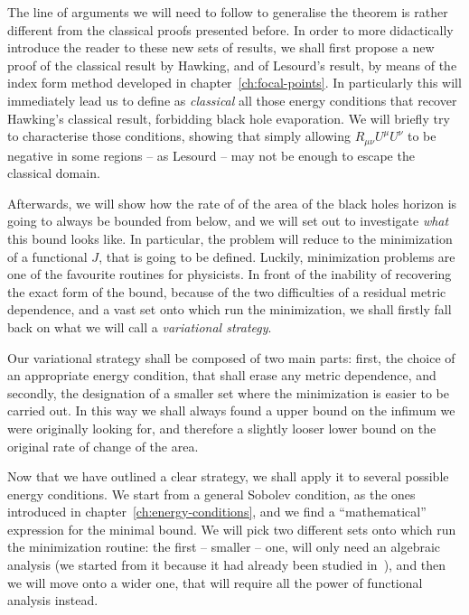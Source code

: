 The line of arguments we will need to follow to generalise the theorem is rather different from the classical proofs presented before. In order to more didactically introduce the reader to these new sets of results, we shall first propose a new proof of the classical result by Hawking, and of Lesourd's result, by means of the index form method developed in chapter~\ref{ch:focal-points}. In particularly this will immediately lead us to define as \emph{classical} all those energy conditions that recover Hawking's classical result, forbidding black hole evaporation. We will briefly try to characterise those conditions, showing that simply allowing \(R_{\mu\nu}U^{\mu}U^{\nu}\) to be negative in some regions -- as Lesourd -- may not be enough to escape the classical domain.

Afterwards, we will show how the rate of of the area of the black holes horizon is going to always be bounded from below, and we will set out to investigate \emph{what} this bound looks like. In particular, the problem will reduce to the minimization of a functional \(J\), that is going to be defined.
Luckily, minimization problems are one of the favourite routines for physicists. In front of the inability of recovering the exact form of the bound, because of the two difficulties of a residual metric dependence, and a vast set onto which run the minimization, we shall firstly fall back on what we will call a \emph{variational strategy}.

Our variational strategy shall be composed of two main parts: first, the choice of an appropriate energy condition, that shall erase any metric dependence, and secondly, the designation of a smaller set where the minimization is easier to be carried out. In this way we shall always found a upper bound on the infimum we were originally looking for, and therefore a slightly looser lower bound on the original rate of change of the area.

Now that we have outlined a clear strategy, we shall apply it to several possible energy conditions. We start from a general Sobolev condition, as the ones introduced in chapter~\ref{ch:energy-conditions}, and we find a ``mathematical'' expression for the minimal bound. We will pick two different sets onto which run the minimization routine: the first -- smaller -- one, will only need an algebraic analysis (we started from it because it had already been studied in~\cite[]{fewster2020new}), and then we will move onto a wider one, that will require all the power of functional analysis instead.

